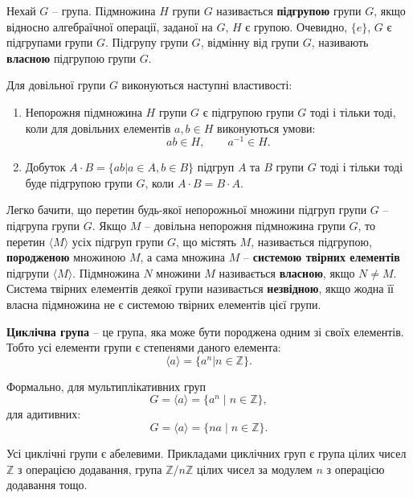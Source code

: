 Нехай $G$ -- група. Підмножина $H$ групи $G$ називається \textbf{підгрупою} групи $G$, якщо відносно алгебраїчної операції, заданої на $G$, $H$ є групою. Очевидно, $\{e\}$, $G$ є підгрупами групи $G$. Підгрупу групи $G$, відмінну від групи $G$, називають \textbf{власною} підгрупою групи $G$.

Для довільної групи $G$ виконуються наступні властивості:

\begin{enumerate}[noitemsep,partopsep=0pt,topsep=0pt,parsep=0pt]
\item Непорожня підмножина $H$ групи $G$ є підгрупою групи $G$ тоді і тільки тоді, коли для довільних елементів $a,b \in H$ виконуються умови:
\[
ab \in H, \qquad a^{-1} \in H.
\]
\item Добуток $A\cdot B = \{ ab | a \in A, b \in B \}$ підгруп $A$ та $B$ групи $G$ тоді і тільки тоді буде підгрупою групи $G$, коли $A\cdot B = B \cdot A$.

\end{enumerate}

Легко бачити, що перетин будь-якої непорожньої множини підгруп групи $G$ -- підгрупа групи $G$. Якщо $M$ -- довільна непорожня підмножина групи $G$, то перетин $\langle M \rangle$ усіх підгруп групи $G$, що містять $M$, називається підгрупою, \textbf{породженою} множиною $M$, а сама множина $M$ -- \textbf{системою твірних елементів} підгрупи $\langle M \rangle$. Підмножина $N$ множини $M$ називається \textbf{власною}, якщо $N \neq M$. Система твірних елементів деякої групи називається \textbf{незвідною}, якщо жодна її власна підмножина не є системою твірних елементів цієї групи.



\textbf{Циклічна група} -- це група, яка може бути породжена одним зі своїх елементів. Тобто усі елементи групи є степенями даного елемента:
\[
\langle a \rangle = \{a^n | n \in \mathbb{Z} \}.
\]

Формально, для мультиплікативних груп
\[
G = \langle a \rangle = \{ a^n \mid n \in \mathbb{Z} \},
\]
для адитивних:
\[
G = \langle a \rangle = \{ na \mid n \in \mathbb{Z} \}.
\]

Усі циклічні групи є абелевими. Прикладами циклічних груп є група цілих чисел $\mathbb{Z}$ з операцією додавання, група $\mathbb{Z} / n \mathbb{Z}$ цілих чисел за модулем $n$ з операцією додавання тощо.

